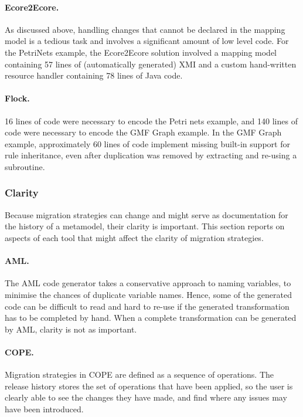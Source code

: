 \paragraph{Ecore2Ecore.} As discussed above, handling changes that cannot be declared in the mapping model is a tedious task and involves a significant amount of low level code. For the PetriNets example, the Ecore2Ecore solution involved a mapping model containing 57 lines of (automatically generated) XMI and a custom hand-written resource handler containing 78 lines of Java code. 

\paragraph{Flock.} 16 lines of code were necessary to encode the Petri nets example, and 140 lines of code were necessary to encode the GMF Graph example.
In the GMF Graph example, approximately 60 lines of code implement missing built-in support for rule inheritance, even after duplication was removed by extracting and re-using a subroutine.


\subsubsection{Clarity}
Because migration strategies can change and might serve as documentation for the history of a metamodel, their clarity is important. This section reports on aspects of each tool that might affect the clarity of migration strategies.

\paragraph{AML.} The AML code generator takes a conservative approach to naming variables, to minimise the chances of duplicate variable names. Hence, some of the generated code can be difficult to read and hard to re-use if the generated transformation has to be completed by hand. When a complete transformation can be generated by AML, clarity is not as important.

\paragraph{COPE.} Migration strategies in COPE are defined as a sequence of operations. The release history stores the set of operations that have been applied, so the user is clearly able to see the changes they have made, and find where any issues may have been introduced.

